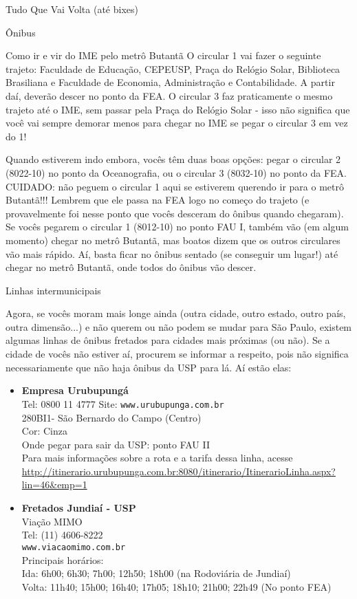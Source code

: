 \begin{secao}{Tudo Que Vai Volta (até bixes)}
\begin{subsecao}{Ônibus}
\begin{subsubsecao}{Como ir e vir do IME pelo metrô Butantã}
O circular 1 vai fazer o seguinte trajeto: Faculdade de Educação, CEPEUSP, Praça do Relógio
Solar, Biblioteca Brasiliana e Faculdade de Economia, Administração e Contabilidade. A partir
daí, deverão descer no ponto da FEA. O circular 3 faz praticamente o mesmo trajeto até o IME,
sem passar pela Praça do Relógio Solar - isso não significa que você vai sempre demorar
menos para chegar no IME se pegar o circular 3 em vez do 1!

Quando estiverem indo embora, vocês têm duas boas opções: pegar o circular 2 (8022-10) no
ponto da Oceanografia, ou o circular 3 (8032-10) no ponto da FEA. CUIDADO: não peguem o
circular 1 aqui se estiverem querendo ir para o metrô Butantã!!! Lembrem que ele passa na FEA
logo no começo do trajeto (e provavelmente foi nesse ponto que vocês desceram do ônibus quando
chegaram). Se vocês pegarem o circular 1 (8012-10) no ponto FAU I, também vão (em algum
momento) chegar no metrô Butantã, mas boatos dizem que os outros circulares vão mais rápido.
Aí, basta ficar no ônibus sentado (se conseguir um lugar!) até chegar no metrô Butantã, onde
todos do ônibus vão descer.

\end{subsubsecao}

\begin{subsubsecao}{Linhas intermunicipais}

Agora, se vocês moram mais longe ainda (outra cidade, outro estado, outro país,
outra dimensão...) e não querem ou não podem se mudar para São Paulo, existem
algumas linhas de ônibus fretados para cidades mais próximas (ou não). Se a cidade
de vocês não estiver aí, procurem se informar a respeito, pois não significa
necessariamente que não haja ônibus da USP para lá. Aí estão elas:

\begin{itemize}
  \item {\bf Empresa Urubupungá}\\
    Tel: 0800 11 4777
    Site: {\tt www.urubupunga.com.br}\\
    280BI1- São Bernardo do Campo (Centro)\\
    Cor: Cinza\\
    Onde pegar para sair da USP: ponto FAU II\\
    Para mais informações sobre a rota e a tarifa dessa linha, acesse
    \url{http://itinerario.urubupunga.com.br:8080/itinerario/ItinerarioLinha.aspx?lin=46\&emp=1}

  \item {\bf Fretados Jundiaí - USP}\\
    Viação MIMO\\
    Tel: (11) 4606-8222\\
    {\tt www.viacaomimo.com.br}\\
    Principais horários:\\
    Ida: 6h00; 6h30; 7h00; 12h50; 18h00 (na Rodoviária de Jundiaí)\\
    Volta: 11h40; 15h00; 16h40; 17h05; 18h10; 21h00; 22h49 (No ponto FEA)


\end{itemize}
\end{subsubsecao}
\end{subsecao}
\end{secao}
